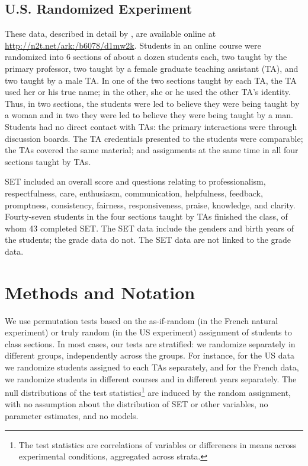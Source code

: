 \documentclass[12pt]{article}
\begin{document}
\subsection{U.S. Randomized Experiment}
These data, described in detail by \cite{MacNell2014}, are available online at 
\url{http://n2t.net/ark:/b6078/d1mw2k}.
Students in an online course were randomized into 6 sections of about a dozen students each, 
two taught by the primary professor,
two taught by a female graduate teaching assistant (TA), and two taught by a male TA.
In one of the two sections taught by each TA, the TA used her or his
true name; in the other, she or he used the other TA's identity.
Thus, in two sections, the students were led to believe they were being taught by a woman
and in two they were led to believe they were being taught by a man.
Students had no direct contact with TAs: the primary interactions were through
discussion boards.
The TA credentials presented to the students were comparable; the TAs covered
the same material; and assignments at the same time in all four sections taught by TAs.

SET included an overall score and questions relating to
professionalism, respectfulness, care, enthusiasm, communication, helpfulness,
feedback, promptness, consistency, fairness, responsiveness, praise, knowledge, 
and clarity.
Fourty-seven students in the four sections taught by TAs finished the class,
of whom 43 completed SET.
The SET data include the genders and birth years of the students; the grade data do not.
The SET data are not linked to the grade data.

\section{Methods and Notation} \label{sec:methods}
We use permutation tests based on the as-if-random (in the French natural experiment)
or truly random (in the US experiment) assignment of students
to class sections.
In most cases, our tests are stratified: we randomize separately in different
groups, independently across the groups.
For instance, for the US data we randomize students assigned to each TAs separately,
and for the French data, we randomize students in different courses and in different years 
separately.
The null distributions of the test statistics\footnote{%
 The test statistics are correlations of variables or differences in means across experimental
 conditions, aggregated across strata.
}
are induced by the random
assignment, with no assumption about the distribution of SET or other variables, 
no parameter estimates, and no models.
\end{document}
